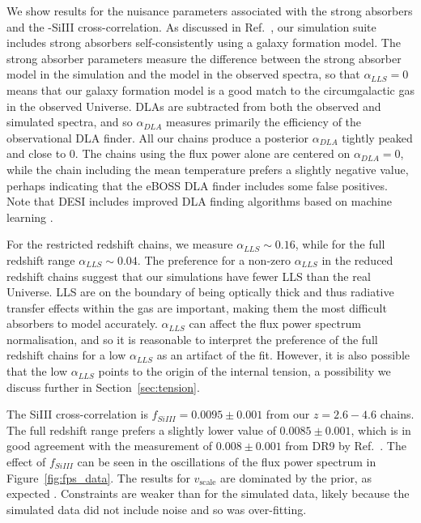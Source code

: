 We show results for the nuisance parameters associated with the strong absorbers and the \Lya-SiIII cross-correlation. As discussed in Ref.~\cite{2023simsuite}, our simulation suite includes strong absorbers self-consistently using a galaxy formation model. The strong absorber parameters measure the difference between the strong absorber model in the simulation and the model in the observed spectra, so that $\alpha_{LLS} = 0$ means that our galaxy formation model is a good match to the circumgalactic gas in the observed Universe. DLAs are subtracted from both the observed and simulated spectra, and so $\alpha_{DLA}$ measures primarily the efficiency of the observational DLA finder. 
All our chains produce a posterior $\alpha_{DLA}$ tightly peaked and close to $0$. The chains using the flux power alone are centered on $\alpha_{DLA} = 0$, while the chain including the mean temperature prefers a slightly negative value, perhaps indicating that the eBOSS DLA finder includes some false positives. Note that DESI includes improved DLA finding algorithms based on machine learning \cite{Ho:2020,Parks:2018}.

For the restricted redshift chains, we measure $\alpha_{LLS} \sim 0.16$, while for the full redshift range $\alpha_{LLS} \sim 0.04$. The preference for a non-zero $\alpha_{LLS}$ in the reduced redshift chains suggest that our simulations have fewer LLS than the real Universe. LLS are on the boundary of being optically thick and thus radiative transfer effects within the gas are important, making them the most difficult absorbers to model accurately. $\alpha_{LLS}$ can affect the flux power spectrum normalisation, and so it is reasonable to interpret the preference of the full redshift chains for a low $\alpha_{LLS}$ as an artifact of the fit. However, it is also possible that the low $\alpha_{LLS}$ points to the origin of the internal tension, a possibility we discuss further in Section~\ref{sec:tension}. 

The SiIII cross-correlation is $f_{SiIII} = 0.0095 \pm 0.001$ from our $z=2.6 - 4.6$ chains. The full redshift range prefers a slightly lower value of $0.0085 \pm 0.001$, which is in good agreement with the measurement of $0.008 \pm 0.001$ from DR9 by Ref.~\cite{2013A&A...559A..85P}. The effect of $f_{SiIII}$ can be seen in the oscillations of the flux power spectrum in Figure~\ref{fig:fps_data}. The results for $v_\mathrm{scale}$ are dominated by the prior, as expected \cite{2015JCAP...11..011P, 2020JCAP...04..038P}. Constraints are weaker than for the simulated data, likely because the simulated data did not include noise and so was over-fitting.

